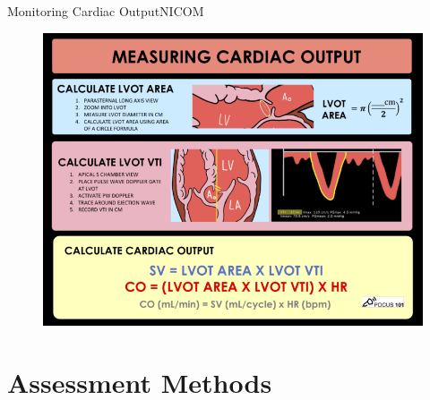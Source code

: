 \documentclass{beamer}
\begin{document}
	\begin{frame}{Monitoring Cardiac Output}{NICOM}
		\begin{figure}
			\centering
			\includegraphics[height=0.8\textheight]{figures/tte-cardiacoutput}
			\label{fig:tte-cardiacoutput}
		\end{figure}
	\end{frame}
	\section{Assessment Methods}
\end{document}
